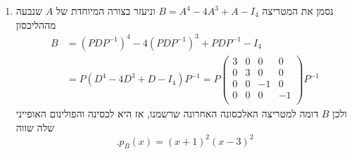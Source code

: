 \documentclass[12pt, a4paper]{article}
\newcommand{\rr}{\mathbb{R}}
\begin{document}
\begin{enumerate}
\begin{enumerate}
    לסיכום, קיבלנו כי המטריצה
    $A$
    לכסינה מעל
    $\rr$
    ומתקיים
    $A=PDP^{-1}$
    כאשר
    $$.D=
    \begin{pmatrix}
    4&0&0&0\\
    0&4&0&0\\
    0&0&0&0\\
    0&0&0&0\\
    \end{pmatrix},\quad
    P=\begin{pmatrix}
        1&0&1&0\\
        1&0&-1&0\\
        0&1&0&1\\
        0&1&0&-1\\
    \end{pmatrix}$$
    \item 
    נסמן את המטריצה
    $B=A^4-4A^3+A-I_4$
    וניעזר בצורה המיוחדת של
    $A$
    שנבעה מההליכסון
    \begin{align*}
       B&=(PDP^{-1})^4-4(PDP^{-1})^3+PDP^{-1}-I_4
       \\&=P(D^4-4D^3+D-I_4)P^{-1}
       =P \begin{pmatrix}
           3&0&0&0\\
           0&3&0&0\\
           0&0&-1&0\\
           0&0&0&-1\\
       \end{pmatrix}P^{-1}
    \end{align*}
    ולכן
    $B$
    דומה למטריצה האלכסונה האחרונה שרשמנו, אז היא לכסינה והפולינום האופייני שלה שווה
    $$.p_B(x)=(x+1)^2(x-3)^2$$
\end{enumerate}    
    \pagebreak \ 
    



\end{enumerate}
\end{document}
